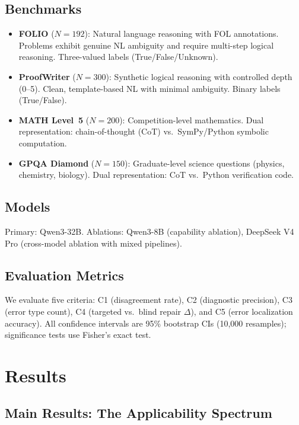 \documentclass[11pt,a4paper]{article}
\begin{document}
\subsection{Benchmarks}

\begin{itemize}
    \item \textbf{FOLIO} ($N=192$): Natural language reasoning with FOL annotations. Problems exhibit genuine NL ambiguity and require multi-step logical reasoning. Three-valued labels (True/False/Unknown).
    \item \textbf{ProofWriter} ($N=300$): Synthetic logical reasoning with controlled depth (0--5). Clean, template-based NL with minimal ambiguity. Binary labels (True/False).
    \item \textbf{MATH Level~5} ($N=200$): Competition-level mathematics. Dual representation: chain-of-thought (CoT) vs.\ SymPy/Python symbolic computation.
    \item \textbf{GPQA Diamond} ($N=150$): Graduate-level science questions (physics, chemistry, biology). Dual representation: CoT vs.\ Python verification code.
\end{itemize}

\subsection{Models}
Primary: Qwen3-32B. Ablations: Qwen3-8B (capability ablation), DeepSeek V4 Pro (cross-model ablation with mixed pipelines).

\subsection{Evaluation Metrics}
We evaluate five criteria: C1 (disagreement rate), C2 (diagnostic precision), C3 (error type count), C4 (targeted vs.\ blind repair $\Delta$), and C5 (error localization accuracy). All confidence intervals are 95\% bootstrap CIs (10,000 resamples); significance tests use Fisher's exact test.

\section{Results}

\subsection{Main Results: The Applicability Spectrum}
\label{sec:main_results}
\end{document}
